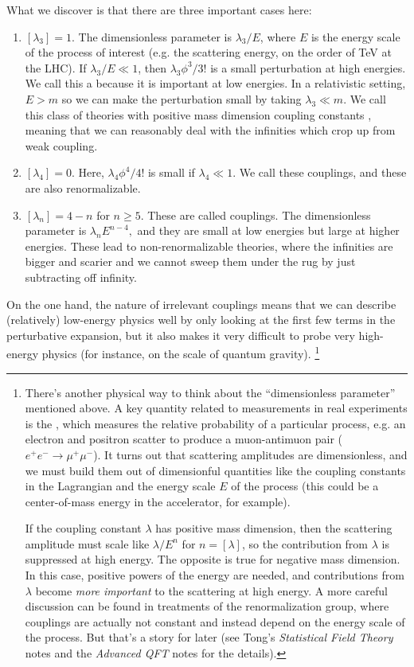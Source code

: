 What we discover is that there are three important cases here:
\begin{enumerate}
    \item $[\lambda_3]=1$. The dimensionless parameter is $\lambda_3/E$, where $E$ is the energy scale of the process of interest (e.g. the scattering energy, on the order of TeV at the LHC). If $\lambda_3/E \ll 1$, then $\lambda_3 \phi^3/3!$ is a small perturbation at high energies. We call this a  because it is important at low  energies. In a relativistic setting, $E>m$ so we can make the perturbation small by taking $\lambda_3\ll m$. We call this class of theories with positive mass dimension coupling constants , meaning that we can reasonably deal with the infinities which crop up from weak coupling.
    \item $[\lambda_4]=0$. Here, $\lambda_4 \phi^4/4!$ is small if $\lambda_4 \ll 1$. We call these  couplings, and these are also renormalizable.
    \item $[\lambda_n]=4-n$ for $n\geq 5$. These are called  couplings. The dimensionless parameter is $\lambda_n E^{n-4},$ and they are small at low energies but large at higher energies. These lead to non-renormalizable theories, where the infinities are bigger and scarier and we cannot sweep them under the rug by just subtracting off infinity.
\end{enumerate}
On the one hand, the nature of irrelevant couplings means that we can describe (relatively) low-energy physics well by only looking at the first few terms in the perturbative expansion, but it also makes it very difficult to probe very high-energy physics (for instance, on the scale of quantum gravity).%
    \footnote{ There's another physical way to think about the ``dimensionless parameter'' mentioned above. A key quantity related to measurements in real experiments is the , which measures the relative probability of a particular process, e.g. an electron and positron scatter to produce a muon-antimuon pair ($e^+ e^- \to \mu^+ \mu^-$). It turns out that scattering amplitudes are dimensionless, and we must build them out of dimensionful quantities like the coupling constants in the Lagrangian and the energy scale $E$ of the process (this could be a center-of-mass energy in the accelerator, for example).
    
    If the coupling constant $\lambda$ has positive mass dimension, then the scattering amplitude must scale like $\lambda/E^n$ for $n=[\lambda]$, so the contribution from $\lambda$ is suppressed at high energy. The opposite is true for negative mass dimension. In this case, positive powers of the energy are needed, and contributions from $\lambda$ become \emph{more important} to the scattering at high energy. A more careful discussion can be found in treatments of the renormalization group, where couplings are actually not constant and instead depend on the energy scale of the process. But that's a story for later (see Tong's \emph{Statistical Field Theory} notes and the \emph{Advanced QFT} notes for the details).}

